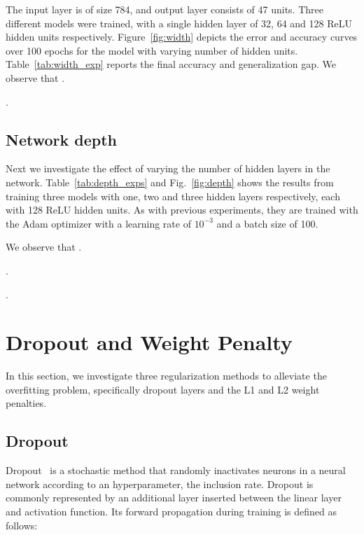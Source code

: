 \documentclass{article}
\begin{document}
The input layer is of size 784, and output layer consists
of 47 units. 
Three different models were trained, with a
single hidden layer of 32, 64 and 128 ReLU hidden units
respectively.
Figure~\ref{fig:width} depicts the error and accuracy curves over 100 epochs for the model with varying number of hidden units.
Table~\ref{tab:width_exp} reports the final accuracy and generalization gap.
We observe that \questionEight.

\questionNine.


\subsection{Network depth}

\questionTableTwo
\questionFigureThree

Next we investigate the effect of varying the number of hidden
layers in the network. 
Table~\ref{tab:depth_exps} and Fig.~\ref{fig:depth} shows the results from
training three models with one, two and three hidden layers respectively,
each with 128 ReLU hidden units. 
As with previous experiments, they are 
trained with the Adam optimizer with a learning rate of  $10^{-3}$ and 
a batch size of 100. 

We observe that \questionTen.

\questionEleven.

\questionTwelve.





\section{Dropout and Weight Penalty}
\label{sec:task2.1} 

In this section, we investigate three regularization methods to 
alleviate the overfitting problem, specifically dropout layers 
and the L1 and L2 weight penalties.

\subsection{Dropout}

Dropout~\cite{srivastava2014dropout}
is a stochastic method that randomly inactivates
neurons in a neural network according to an hyperparameter, the
inclusion rate. Dropout is commonly represented by an 
additional layer inserted between the linear layer and 
activation function.
Its forward propagation during training is defined as follows:
\end{document}
